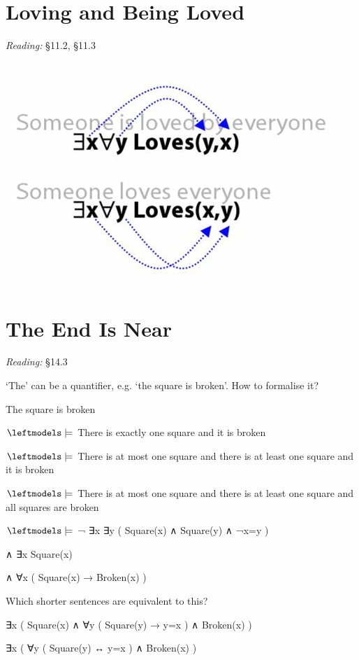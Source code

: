 \documentclass[12pt]{extarticle}
\begin{document}
\begin{multicols*}{3}
 
\section{Loving and Being Loved}
 
\emph{Reading:} §11.2, §11.3
 
\begin{center}
\includegraphics[scale=0.3]{img/unit_755_loved.png}
\end{center}
 
 
\section{The End Is Near}
 
\emph{Reading:} §14.3
 
‘The’ can be a quantifier, e.g. ‘the square is broken’. How to formalise it?
 
The square is broken
 
$\leftmodels\models$ There is exactly one square and it is broken
 
$\leftmodels\models$ There is at most one square and there is at least one square and it is broken
 
$\leftmodels\models$ There is at most one square and there is at least one square and all squares are broken
 
$\leftmodels\models$ ¬ ∃x ∃y ( Square(x) ∧ Square(y) ∧ ¬x=y )
 
\hspace{5mm} ∧ ∃x Square(x)
 
\hspace{5mm} ∧ ∀x ( Square(x) → Broken(x) )
 
Which shorter sentences are equivalent to this?
 
∃x ( Square(x) ∧ ∀y ( Square(y) → y=x ) ∧ Broken(x) )
 
∃x ( ∀y ( Square(y) ↔ y=x ) ∧ Broken(x) )
 
\vfill


 


\end{multicols*}
\end{document}
